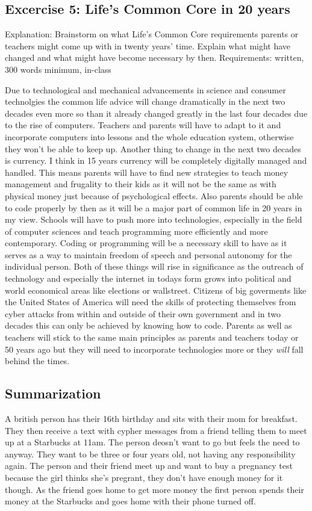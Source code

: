 \documentclass{article}
\begin{document}
\subsection{Excercise 5: Life's Common Core in 20 years}
Explanation: Brainstorm on what Life's Common Core requirements parents or teachers might come up with in twenty years' time. Explain what might have changed and what might have become necessary by then.
Requirements: written, 300 words minimum, in-class

Due to technological and mechanical advancements in science and consumer               technolgies the common life advice will change dramatically in the next two decades even more so than it already changed greatly in the last four decades due to the rise of computers. Teachers and parents will have to adapt to it and incorporate computers into lessons and the whole education system, otherwise they won't be able to keep up. Another thing to change in the next two decades is currency. I think in 15 years currency will be completely digitally managed and handled. This means parents will have to find new strategies to teach money management and frugality to their kids as it will not be the same as with physical money just because of psychological effects. Also parents should be able to code properly by then as it will be a major part of common life in 20 years in my view. Schools will have to push more into technologies, especially in the field of computer sciences and teach programming more efficiently and more contemporary. Coding or programming will be a necessary skill to have as it serves as a way to maintain freedom of speech and personal autonomy for the individual person. Both of these things will rise in significance as the outreach of technology and especially the internet in todays form grows into political and world economical areas like elections or wallstreet. Citizens of big goverments like the United States of America will need the skills of protecting themselves from cyber attacks from within and outside of their own government and in two decades this can only be achieved by knowing how to code. Parents as well as teachers will stick to the same main principles as parents and teachers today or 50 years ago but they will need to incorporate technologies more or they \textit{will} fall behind the times.

\subsection{Summarization}
A british person has their 16th birthday and sits with their mom for breakfast. They then receive a text with cypher messages from a friend telling them to meet up at a Starbucks at 11am. The person deosn't want to go but feels the need to anyway. They want to be three or four years old, not having any responsibility again. The person and their friend meet up and want to buy a pregnancy test because the girl thinks she's pregrant, they don't have enough money for it though. As the friend goes home to get more money the first person spends their money at the Starbucks and goes home with their phone turned off.
\end{document}
